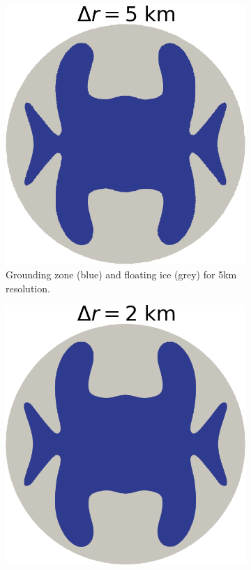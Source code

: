 \documentclass{article}
\begin{document}
\begin{figure}[!h]
	\medskip
	\begin{subfigure}{0.25\textwidth}
		\includegraphics[width=\linewidth]{../fig/Grounded_zone_5km.png}
		\caption{Grounding zone (blue) and floating ice (grey) for 5km resolution.}
		\label{fig:4}
	\end{subfigure}\hfil %
	\begin{subfigure}{0.25\textwidth}
		\includegraphics[width=\linewidth]{../fig/Grounded_zone_2km.png}

\end{subfigure}
\end{figure}
\end{document}
